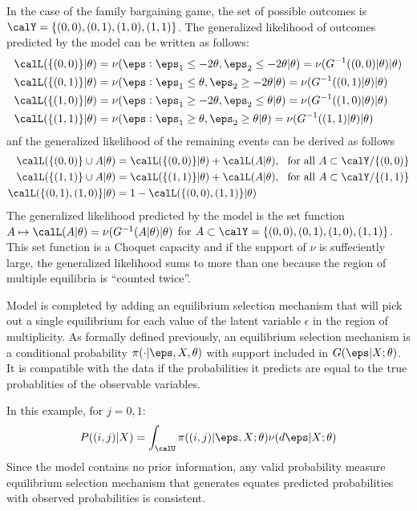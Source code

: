 In the case of the family bargaining game, the set of possible outcomes is $\calY = \{(0,0),(0,1),(1,0),(1,1)\}$. The generalized likelihood of outcomes predicted by the model can be written as follows: 
\begin{align*}
 	\calL(\{(0,0)\}|\theta) &= \nu(\eps: \eps_1 \leq -2\theta, \eps_2 \leq -2\theta| \theta) = \nu(G^{-1}((0,0)|\theta)|\theta)\\
 	\calL(\{(0,1)\}|\theta) &= \nu(\eps: \eps_1 \leq \theta, \eps_2 \geq -2\theta| \theta) = \nu(G^{-1}((0,1)|\theta)|\theta)\\
 	\calL(\{(1,0)\}|\theta) &= \nu(\eps: \eps_1 \geq -2\theta, \eps_2 \leq \theta| \theta) = \nu(G^{-1}((1,0)|\theta)|\theta)\\
 	\calL(\{(1,1)\}|\theta) &= \nu(\eps: \eps_1 \geq \theta, \eps_2 \geq \theta| \theta) = \nu(G^{-1}((1,1)|\theta)|\theta)
\end{align*}
anf the generalized likelihood of the remaining events can be derived as follows 
\begin{align*}
	\calL(\{(0,0)\}\cup A | \theta) &= \calL(\{(0,0)\}|\theta) + \calL(A|\theta),\hbox{ }\text{ for all }A \subset \calY/\{(0,0)\}\\
	\calL(\{(1,1)\}\cup A | \theta) &= \calL(\{(1,1)\}|\theta) + \calL(A|\theta),\hbox{ }\text{ for all }A \subset \calY/\{(1,1)\} \\
	\calL(\{(0,1),(1,0)\}|\theta) &= 1 - \calL(\{(0,0),(1,1)\}|\theta)
\end{align*}
The generalized likelihood predicted by the model is the set function $A\mapsto \calL(A|\theta) = \nu(G^{-1}(A|\theta)|\theta)$ for $A \subset \calY = \{(0,0),(0,1),(1,0),(1,1)\}$. This set function is a Choquet capacity and if the support of $\nu$ is suffeciently large, the generalized likelihood sums to more than one because the region of multiple equilibria is ``counted twice''. 

Model is completed by adding an equilibrium selection mechanism that will pick out a single equilibrium for each value of the latent variable $\epsilon$ in the region of multiplicity. As formally defined previously, an equilibrium selection mechanism is a conditional probability $\pi(\cdot | \eps, X,\theta)$ with support included in $G(\eps|X;\theta)$. It is compatible with the data if the probabilities it predicts are equal to the true probablities of the observable variables. 

In this example, for $j = 0,1$:
\[P((i,j)|X) = \int_\calU \pi((i,j)|\eps, X;\theta)\nu(d\eps|X;\theta)\]
Since the model contains no prior information, any valid probability measure equilibrium selection mechanism that generates equates predicted probabilities with observed probabilities is consistent.


